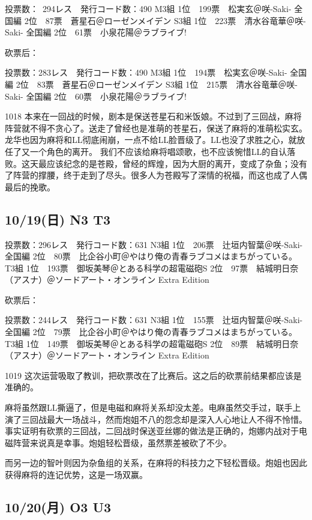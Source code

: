 	投票数：~294レス　発行コード数：490
	M3組
	1位　199票　松実玄＠咲-Saki- 全国編
	2位　87票　蒼星石＠ローゼンメイデン
	S3組
	1位　223票　清水谷竜華＠咲-Saki- 全国編
	2位　61票　小泉花陽＠ラブライブ!

砍票后：

	投票数：283レス　発行コード数：490
	M3組
	1位　194票　松実玄＠咲-Saki- 全国編
	2位　83票　蒼星石＠ローゼンメイデン
	S3組
	1位　215票　清水谷竜華＠咲-Saki- 全国編
	2位　60票　小泉花陽＠ラブライブ!

1018 本来在一回战的时候，剧本是保送苍星石和米饭娘。不过到了三回战，麻将阵营就不得不贪心了。送走了曾经也是准萌的苍星石，保送了麻将的准萌松实玄。龙华也因为麻将和LL彻底闹崩，一点不给LL脸晋级了。LL也没了求胜之心，就放任了又一个角色的离开。
我们不应该给麻将唱颂歌，也不应该惋惜LL的自认落败。这天最应该纪念的是苍殿，曾经的辉煌，因为大厨的离开，变成了杂鱼；没有了阵营的撑腰，终于走到了尽头。很多人为苍殿写了深情的祝福，而这也成了人偶最后的挽歌。

\subsection{10/19(日) N3 T3}

	投票数：296レス　発行コード数：631
	N3組
	1位　206票　辻垣内智葉＠咲-Saki- 全国編
	2位　80票　比企谷小町＠やはり俺の青春ラブコメはまちがっている。
	T3組
	1位　193票　御坂美琴＠とある科学の超電磁砲S
	2位　97票　結城明日奈（アスナ）＠ソードアート・オンライン Extra Edition

砍票后：

	投票数：244レス　発行コード数：631
	N3組
	1位　155票　辻垣内智葉＠咲-Saki- 全国編
	2位　79票　比企谷小町＠やはり俺の青春ラブコメはまちがっている。
	T3組
	1位　149票　御坂美琴＠とある科学の超電磁砲S
	2位　89票　結城明日奈（アスナ）＠ソードアート・オンライン Extra Edition

1019 这次运营吸取了教训，把砍票改在了比赛后。这之后的砍票前结果都应该是准确的。

麻将虽然跟LL撕逼了，但是电磁和麻将关系却没太差。电麻虽然交手过，联手上演了三回战最大一场战斗，然而炮姐不八的怨念却是深入人心地让人不得不怜惜。事实证明有砍票的三回战，二回战时保送亚丝娜的做法是正确的，炮娜内战对于电磁阵营来说真是幸事。炮姐轻松晋级，虽然票差被砍了不少。

而另一边的智叶则因为杂鱼组的关系，在麻将的科技力之下轻松晋级。炮姐也因此获得麻将的连记优势，这是一场双赢。

\subsection{10/20(月) O3 U3}


